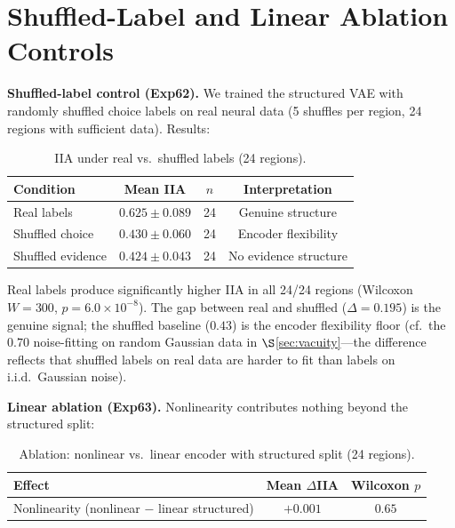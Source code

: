 \documentclass{article}
\begin{document}
\section{Shuffled-Label and Linear Ablation Controls}
\label{app:shuffled_ablation}

\textbf{Shuffled-label control (Exp62).} We trained the structured VAE with randomly shuffled choice labels on real neural data (5 shuffles per region, 24 regions with sufficient data). Results:

\begin{table}[h]
\centering
\small
\caption{IIA under real vs.\ shuffled labels (24 regions).}
\label{tab:shuffled}
\begin{tabular}{@{}lccc@{}}
\toprule
\textbf{Condition} & \textbf{Mean IIA} & \textbf{$n$} & \textbf{Interpretation} \\
\midrule
Real labels & $0.625 \pm 0.089$ & 24 & Genuine structure \\
Shuffled choice & $0.430 \pm 0.060$ & 24 & Encoder flexibility \\
Shuffled evidence & $0.424 \pm 0.043$ & 24 & No evidence structure \\
\bottomrule
\end{tabular}
\end{table}

Real labels produce significantly higher IIA in all 24/24 regions (Wilcoxon $W = 300$, $p = 6.0 \times 10^{-8}$). The gap between real and shuffled ($\Delta = 0.195$) is the genuine signal; the shuffled baseline ($0.43$) is the encoder flexibility floor (cf.\ the $0.70$ noise-fitting on random Gaussian data in $\S$\ref{sec:vacuity}---the difference reflects that shuffled labels on real data are harder to fit than labels on i.i.d.\ Gaussian noise).

\textbf{Linear ablation (Exp63).} Nonlinearity contributes nothing beyond the structured split:

\begin{table}[h]
\centering
\small
\caption{Ablation: nonlinear vs.\ linear encoder with structured split (24 regions).}
\label{tab:linear_ablation}
\begin{tabular}{@{}lcc@{}}
\toprule
\textbf{Effect} & \textbf{Mean $\Delta$IIA} & \textbf{Wilcoxon $p$} \\
\midrule
Nonlinearity (nonlinear $-$ linear structured) & $+0.001$ & $0.65$ \\
\bottomrule
\end{tabular}
\end{table}
\end{document}
